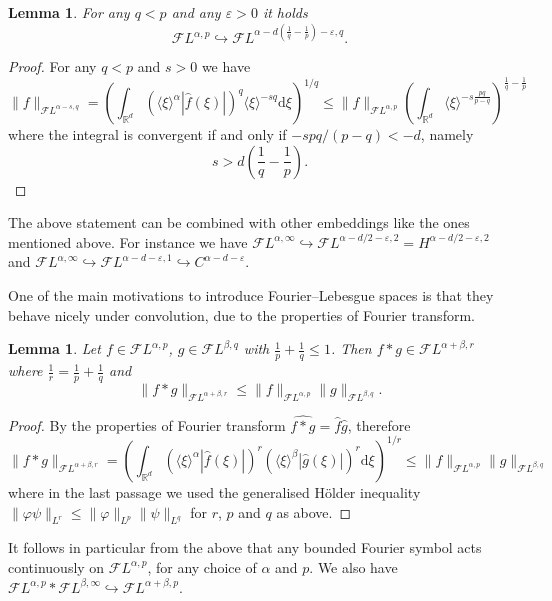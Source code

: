 \documentclass[10pt]{article}
\newcommand{\mathd}{\mathrm{d}}
\newtheorem{lemma}[theorem]{Lemma}
\begin{document}
\begin{lemma}
  \label{appendixA2 fourier lebesgue embedding}For any $q < p$ and any
  $\varepsilon > 0$ it holds
  \[ \mathcal{F} L^{\alpha, p} \hookrightarrow \mathcal{F} L^{\alpha - d
     \left( \frac{1}{q} - \frac{1}{p} \right) - \varepsilon, q} . \]
\end{lemma}

\begin{proof}
  For any $q < p$ and $s > 0$ we have
  \[ \| f \|_{\mathcal{F} L^{\alpha - s, q}} = \left( \int_{\mathbb{R}^d}
     (\langle \xi \rangle^{\alpha} | \hat{f} (\xi) |)^q \langle \xi \rangle^{-
     s q} \mathd \xi \right)^{1 / q} \leqslant \| f \|_{\mathcal{F} L^{\alpha,
     p}}  \left( \int_{\mathbb{R}^d} \langle \xi \rangle^{- s \frac{p q}{p -
     q}} \right)^{\frac{1}{q} - \frac{1}{p}} \]
  where the integral is convergent if and only if $- s p q / (p - q) < - d$,
  namely
  \[ s > d \left( \frac{1}{q} - \frac{1}{p} \right) . \]
\end{proof}

The above statement can be combined with other embeddings like the ones
mentioned above. For instance we have $\mathcal{F} L^{\alpha, \infty}
\hookrightarrow \mathcal{F} L^{\alpha - d / 2 - \varepsilon, 2} = H^{\alpha -
d / 2 - \varepsilon, 2}$ and $\mathcal{F} L^{\alpha, \infty} \hookrightarrow
\mathcal{F} L^{\alpha - d - \varepsilon, 1} \hookrightarrow C^{\alpha - d -
\varepsilon}$.

One of the main motivations to introduce Fourier--Lebesgue spaces is that they
behave nicely under convolution, due to the properties of Fourier transform.

\begin{lemma}
  \label{appendixA2 fourier lebesgue convolution}Let $f \in \mathcal{F}
  L^{\alpha, p}$, $g \in \mathcal{F} L^{\beta, q}$ with $\frac{1}{p} +
  \frac{1}{q} \leqslant 1$. Then $f \ast g \in \mathcal{F} L^{\alpha + \beta,
  r}$ where $\frac{1}{r} = \frac{1}{p} + \frac{1}{q}$ and
  \[ \| f \ast g \|_{\mathcal{F} L^{\alpha + \beta, r}} \leqslant \| f
     \|_{\mathcal{F} L^{\alpha, p}} \| g \|_{\mathcal{F} L^{\beta, q}} . \]
\end{lemma}

\begin{proof}
  By the properties of Fourier transform $\widehat{f \ast g} = \widehat{f} 
  \hat{g}$, therefore
  \[ \| f \ast g \|_{\mathcal{F} L^{\alpha + \beta, r}} = \left(
     \int_{\mathbb{R}^d} (\langle \xi \rangle^{\alpha} | \hat{f} (\xi) |)^r 
     (\langle \xi \rangle^{\beta} | \hat{g} (\xi) |)^r \mathd \xi \right)^{1 /
     r} \leqslant \| f \|_{\mathcal{F} L^{\alpha, p}} \| g \|_{\mathcal{F}
     L^{\beta, q}} \]
  where in the last passage we used the generalised H\"{o}lder inequality $\|
  \varphi \psi \|_{L^r} \leqslant \| \varphi \|_{L^p} \| \psi \|_{L^q}$ for
  $r$, $p$ and $q$ as above.
\end{proof}

It follows in particular from the above that any bounded Fourier symbol acts
continuously on $\mathcal{F} L^{\alpha, p}$, for any choice of $\alpha$ and
$p$. We also have $\mathcal{F} L^{\alpha, p} \ast \mathcal{F} L^{\beta,
\infty} \hookrightarrow \mathcal{F} L^{\alpha + \beta, p}$.

{}

\end{document}

